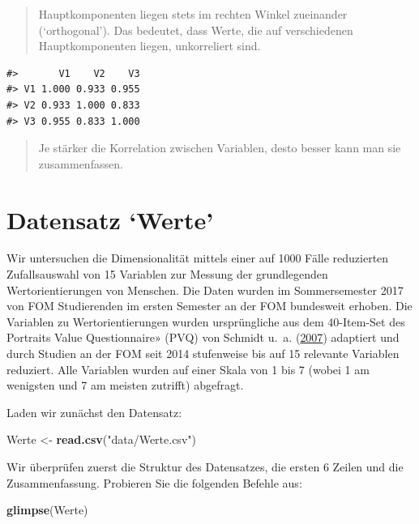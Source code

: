 \documentclass[12pt,ngerman,]{book}
\makeatletter
\newenvironment{Shaded}{\begin{snugshade}}{\end{snugshade}}
\newcommand{\KeywordTok}[1]{\textcolor[rgb]{0.13,0.29,0.53}{\textbf{#1}}}
\newcommand{\StringTok}[1]{\textcolor[rgb]{0.31,0.60,0.02}{#1}}
\newcommand{\NormalTok}[1]{#1}
\newenvironment{kframe}{%
\medskip{}
\setlength{\fboxsep}{.8em}
 \def\at@end@of@kframe{}%
 \ifinner\ifhmode%
  \def\at@end@of@kframe{\end{minipage}}%
  \begin{minipage}{\columnwidth}%
 \fi\fi%
 \def\FrameCommand##1{\hskip\@totalleftmargin \hskip-\fboxsep
 \colorbox{shadecolor}{##1}\hskip-\fboxsep
     \hskip-\linewidth \hskip-\@totalleftmargin \hskip\columnwidth}%
 \MakeFramed {\advance\hsize-\width
   \@totalleftmargin\z@ \linewidth\hsize
   \@setminipage}}%
 {\par\unskip\endMakeFramed%
 \at@end@of@kframe}
\renewenvironment{Shaded}{\begin{kframe}}{\end{kframe}}
\theoremstyle{definition}
\theoremstyle{definition}
\theoremstyle{remark}
\makeatother
\begin{document}
\begin{quote}
Hauptkomponenten liegen stets im rechten Winkel zueinander
(`orthogonal'). Das bedeutet, dass Werte, die auf verschiedenen
Hauptkomponenten liegen, unkorreliert sind.
\end{quote}

\begin{verbatim}
#>       V1    V2    V3
#> V1 1.000 0.933 0.955
#> V2 0.933 1.000 0.833
#> V3 0.955 0.833 1.000
\end{verbatim}

\begin{quote}
Je stärker die Korrelation zwischen Variablen, desto besser kann man sie
zusammenfassen.
\end{quote}

\section{\texorpdfstring{Datensatz
`Werte'}{Datensatz Werte}}\label{datensatz-werte}

Wir untersuchen die Dimensionalität mittels einer auf 1000 Fälle
reduzierten Zufallsauswahl von 15 Variablen zur Messung der
grundlegenden Wertorientierungen von Menschen. Die Daten wurden im
Sommersemester 2017 von FOM Studierenden im ersten Semester an der FOM
bundesweit erhoben. Die Variablen zu Wertorientierungen wurden
ursprüngliche aus dem 40-Item-Set des Portraits Value Questionnaire»
(PVQ) von Schmidt u.~a. (\protect\hyperlink{ref-Schmidt2007}{2007})
adaptiert und durch Studien an der FOM seit 2014 stufenweise bis auf 15
relevante Variablen reduziert. Alle Variablen wurden auf einer Skala von
1 bis 7 (wobei 1 am wenigsten und 7 am meisten zutrifft) abgefragt.

Laden wir zunächst den Datensatz:

\begin{Shaded}
\begin{Highlighting}[]
\NormalTok{Werte <-}\StringTok{ }\KeywordTok{read.csv}\NormalTok{(}\StringTok{"data/Werte.csv"}\NormalTok{)}
\end{Highlighting}
\end{Shaded}

Wir überprüfen zuerst die Struktur des Datensatzes, die ersten 6 Zeilen
und die Zusammenfassung. Probieren Sie die folgenden Befehle aus:

\begin{Shaded}
\begin{Highlighting}[]
\KeywordTok{glimpse}\NormalTok{(Werte)}
\end{Highlighting}
\end{Shaded}
\end{document}
